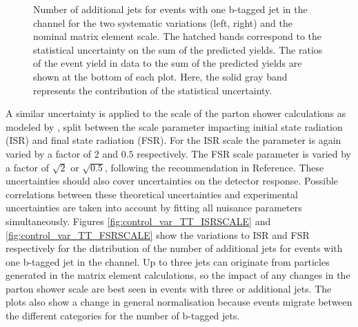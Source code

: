 \begin{figure}[htbp!]
\begin{center}
\caption{Number of additional jets for events with one b-tagged jet in the \emu channel for the two systematic variations (left, right) and the nominal \ttbar matrix element scale.
The hatched bands correspond to the statistical uncertainty on the sum of the predicted yields. 
        The ratios of the event yield in data to the sum of the predicted yields are
        shown at the bottom of each plot. Here, the solid gray band
        represents the contribution of the statistical uncertainty.
  \label{fig:control_var_TT_MESCALE}}
  \end{center}
\end{figure}

A similar uncertainty is applied to the scale of the parton shower calculations as modeled by \PYTHIA, split between the scale parameter impacting initial state radiation (ISR) and final state radiation (FSR). 
For the ISR scale the parameter is again varied by a factor of $2$ and $0.5$ respectively. The FSR scale parameter is varied by a factor of $\sqrt{2}$ or $\sqrt{0.5}$, following the recommendation
in Reference\cite{Skands:2014pea}. 
These uncertainties should also cover uncertainties on the detector response. Possible correlations between these theoretical uncertainties and  experimental uncertainties 
are taken into account by fitting all nuisance parameters simultaneously.
Figures \ref{fig:control_var_TT_ISRSCALE}
and \ref{fig:control_var_TT_FSRSCALE} show the variations to ISR and FSR respectively for the distribution of the number of additional jets for events with one b-tagged jet in the \emu channel.
Up to three jets can originate from particles generated in the matrix element calculations, so the impact of any changes in the parton shower scale are best seen in events with three or additional jets.
The plots also show a change in general normalisation because events migrate between the different categories for the number of b-tagged jets.

